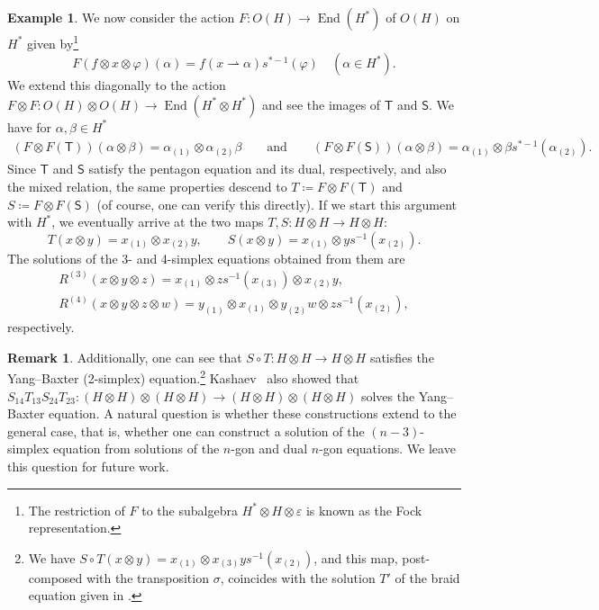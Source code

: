 \documentclass[10pt,a4paper]{amsart}
\numberwithin{equation}{section}
\theoremstyle{definition}
\newtheorem{Example}[Theorem]{Example}
\newtheorem{Remark}[Theorem]{Remark}
\begin{document}
\begin{Example}
 We now consider the action $F\colon O(H)\to\operatorname{End}(H^*)$ of $O(H)$ on $H^*$ given by\footnote{The restriction of $F$ to the subalgebra $H^*\otimes H\otimes \varepsilon$ is known as the Fock representation.}
 \begin{equation*}
 F(f\otimes x\otimes\varphi)(\alpha)=f(x\rightharpoonup\alpha)s^{*-1}(\varphi)\quad (\alpha\in H^*).
 \end{equation*}
 We extend this diagonally to the action $F\otimes F\colon O(H)\otimes O(H)\to\operatorname{End}(H^*\otimes H^*)$ and see the images of $\mathsf{T}$ and $\mathsf{S}$.
 We have for $\alpha,\beta\in H^*$
 \begin{align*}
 (F\otimes F(\mathsf{T}))(\alpha\otimes\beta) = \alpha_{(1)}\otimes\alpha_{(2)}\beta \qquad\text{and}\qquad (F\otimes F(\mathsf{S}))(\alpha\otimes\beta) = \alpha_{(1)}\otimes\beta s^{*-1}(\alpha_{(2)}).
 \end{align*}
 Since $\mathsf{T}$ and $\mathsf{S}$ satisfy the pentagon equation and its dual, respectively, and also the mixed relation, the same properties descend to $T\coloneqq F\otimes F(\mathsf{T})$ and $S\coloneqq F\otimes F(\mathsf{S})$ (of course, one can verify this directly). If we start this argument with $H^*$, we eventually arrive at the two maps $T,S\colon H\otimes H\to H\otimes H$:
 \begin{equation*}
 T(x\otimes y) = x_{(1)}\otimes x_{(2)}y,\qquad S(x\otimes y) = x_{(1)}\otimes ys^{-1}(x_{(2)}).
 \end{equation*}
 The solutions of the 3- and 4-simplex equations obtained from them are
 \begin{gather*}
 R^{(3)}(x\otimes y\otimes z) = x_{(1)}\otimes zs^{-1}(x_{(3)})\otimes x_{(2)}y,\\ R^{(4)}(x\otimes y\otimes z\otimes w) = y_{(1)}\otimes x_{(1)}\otimes y_{(2)}w\otimes zs^{-1}(x_{(2)}),
 \end{gather*}
 respectively.

 \begin{Remark}
 Additionally, one can see that $S\circ T\colon H\otimes H\to H\otimes H$ satisfies the Yang--Baxter (2-simplex) equation.\footnote{We have $S\circ T(x\otimes y)=x_{(1)}\otimes x_{(3)}ys^{-1}(x_{(2)})$, and this map, post-composed with the transposition $\sigma$, coincides with the solution $T'$ of the braid equation given in \cite{woronowicz1991solutions}.} Kashaev~\cite{kashaev1995heisenberg} also showed that $S_{14}T_{13}S_{24}T_{23}\colon(H\otimes H)\otimes(H\otimes H)\to (H\otimes H)\otimes(H\otimes H)$ solves the Yang--Baxter equation. A natural question is whether these constructions extend to the general case, that is, whether one can construct a solution of the $(n-3)$-simplex equation from solutions of the $n$-gon and dual $n$-gon equations. We leave this question for future work.
 \end{Remark}
\end{Example}
\end{document}
